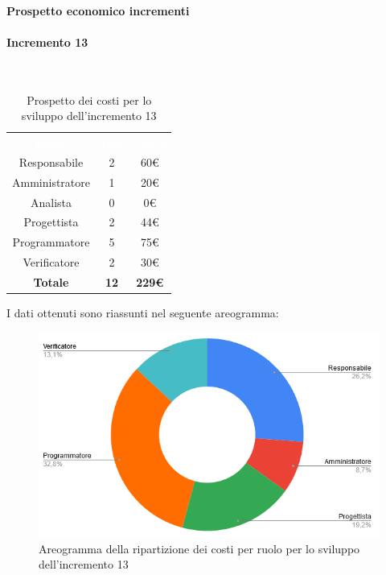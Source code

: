 \paragraph{Prospetto economico incrementi}
\paragraph*{Incremento 13}\mbox{} \\
\begin{table}[H]
\centering\renewcommand{\arraystretch}{1.5}
\caption{Prospetto dei costi per lo sviluppo dell'incremento 13}
\vspace{0.2cm}
\begin{tabular}{ c c c }
\rowcolor{redafk}
\textcolor{white}{\textbf{Ruolo}} & \textcolor{white}{\textbf{Ore}} &
\textcolor{white}{\textbf{Costo}}  \\
Responsabile & 2 & 60€ \\
Amministratore & 1 & 20€ \\
Analista & 0 & 0€ \\
Progettista & 2 & 44€ \\
Programmatore & 5 & 75€  \\
Verificatore & 2 & 30€  \\
\rowcolor{lastrowcolor}
\textbf{Totale} & \textbf{12} & \textbf{229€}  \\
\end{tabular}
\end{table}
 
I dati ottenuti sono riassunti nel seguente areogramma:
\begin{figure}[H]
\centering
\includegraphics[scale=0.60]{img/grafici/torta_inc13.png}
\caption{Areogramma della ripartizione dei costi per ruolo per lo sviluppo dell'incremento 13}
\end{figure}

